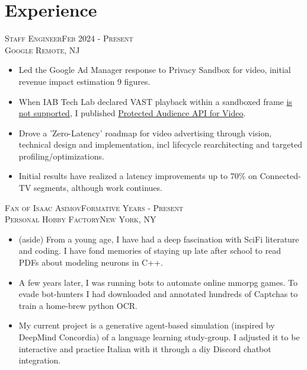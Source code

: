 \section{Experience}
\textsc{Staff Engineer\hfill Feb 2024 - Present\\}
\textsc{Google \hfill Remote, NJ\\}
\begin{itemize}
	\setlength{\itemsep}{1pt}
	\setlength{\parskip}{0pt}
	\setlength{\parsep}{0pt}
	\setlength{\leftmargin}{-5mm}
  \item Led the Google Ad Manager response to Privacy Sandbox for video, initial revenue impact estimation 9 figures.
  \item When IAB Tech Lab declared VAST playback within a sandboxed frame
      \href{https://iabtechlab.com/wp-content/uploads/2024/06/Privacy-Sandbox-Fit-Gap-Analysis-FINAL.pdf}{is not supported},
      I published \href{https://github.com/google/ads-privacy/tree/master/proposals/protected-audience-video}{Protected Audience API for Video}.
  \item Drove a 'Zero-Latency' roadmap for video advertising through vision, technical design and implementation, incl lifecycle rearchitecting and targeted profiling/optimizations.
  \item Initial results have realized a latency improvements up to 70\% on Connected-TV segments, although work continues.
\end{itemize}
        

\textsc{Fan of Isaac Asimov\hfill Formative Years - Present\\}
\textsc{Personal Hobby Factory\hfill New York, NY\\}
\begin{itemize}
	\setlength{\itemsep}{1pt}
	\setlength{\parskip}{0pt}
	\setlength{\parsep}{0pt}
	\setlength{\leftmargin}{-5mm}

    \item (aside) From a young age, I have had a deep fascination with SciFi literature and coding. I have fond memories of staying up late after school to read PDFs about modeling neurons in C++.

    \item A few years later, I was running bots to automate online mmorpg games. To evade bot-hunters I had downloaded and annotated hundreds of Captchas to train a home-brew python OCR.

    \item My current project is a generative agent-based simulation (inspired by DeepMind Concordia) of a language learning study-group. I adjusted it to be interactive and practice Italian with it through a diy Discord chatbot integration.
\end{itemize}


